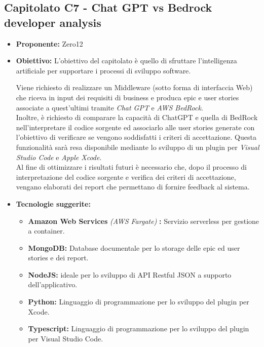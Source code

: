 \documentclass{article}
\begin{document}
\subsection{\textbf{Capitolato C7} - Chat GPT vs Bedrock developer analysis}
\begin{itemize}
    \item[] \textbf{Proponente:} Zero12
    
    \item[] \textbf{Obiettivo:} L’obiettivo del capitolato è quello di sfruttare l’intelligenza artificiale per supportare i processi di sviluppo software.
    
    Viene richiesto di realizzare un Middleware (sotto forma di interfaccia Web) che riceva in input dei requisiti di business e produca epic e user stories associate a quest’ultimi tramite \textit{Chat GPT} e \textit{AWS BedRock}. \\
    Inoltre, è richiesto di comparare la capacità di ChatGPT e quella di BedRock nell’interpretare il codice sorgente ed associarlo alle user stories generate con l'obiettivo di verificare se vengono soddisfatti i criteri di accettazione. Questa funzionalità sarà resa disponibile mediante lo sviluppo di un plugin per \textit{Visual Studio Code} e \textit{Apple Xcode}. \\
    Al fine di ottimizzare i risultati futuri è necessario che, dopo il processo di interpretazione del codice sorgente e verifica dei criteri di accettazione, vengano elaborati dei report che permettano di fornire feedback al sistema.

    \item[] \textbf{Tecnologie suggerite:} 
    \begin{itemize}
        \item \textbf{Amazon Web Services} \textit{(AWS Fargate)} \textbf{:} Servizio serverless per gestione a container.
        \item \textbf{MongoDB:} Database documentale per lo storage delle epic ed user stories e dei report.
        \item \textbf{NodeJS:} ideale per lo sviluppo di API Restful JSON a supporto dell’applicativo.
        \item \textbf{Python:} Linguaggio di programmazione per lo sviluppo del plugin per Xcode.
        \item \textbf{Typescript:} Linguaggio di programmazione per lo sviluppo del plugin per Visual Studio Code.
    \end{itemize}


\end{itemize}
\end{document}
